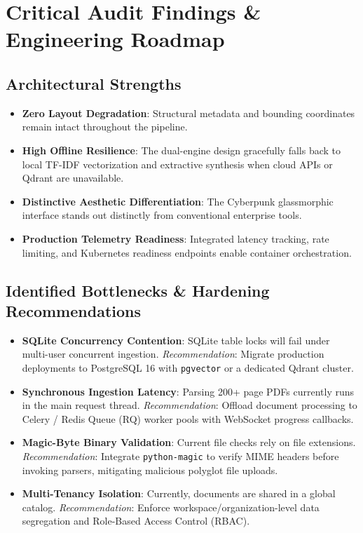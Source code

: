 \documentclass[11pt,a4paper]{article}
\begin{document}
\section{Critical Audit Findings \& Engineering Roadmap}

\subsection{Architectural Strengths}
\begin{itemize}[leftmargin=*]
    \item[\textcolor{successgreen}{\checkmark}] \textbf{Zero Layout Degradation}: Structural metadata and bounding coordinates remain intact throughout the pipeline.
    \item[\textcolor{successgreen}{\checkmark}] \textbf{High Offline Resilience}: The dual-engine design gracefully falls back to local TF-IDF vectorization and extractive synthesis when cloud APIs or Qdrant are unavailable.
    \item[\textcolor{successgreen}{\checkmark}] \textbf{Distinctive Aesthetic Differentiation}: The Cyberpunk glassmorphic interface stands out distinctly from conventional enterprise tools.
    \item[\textcolor{successgreen}{\checkmark}] \textbf{Production Telemetry Readiness}: Integrated latency tracking, rate limiting, and Kubernetes readiness endpoints enable container orchestration.
\end{itemize}

\subsection{Identified Bottlenecks \& Hardening Recommendations}
\begin{itemize}[leftmargin=*]
    \item[\textcolor{alertred}{\textbf{!}}] \textbf{SQLite Concurrency Contention}: SQLite table locks will fail under multi-user concurrent ingestion. \textit{Recommendation}: Migrate production deployments to PostgreSQL 16 with \texttt{pgvector} or a dedicated Qdrant cluster.
    \item[\textcolor{alertred}{\textbf{!}}] \textbf{Synchronous Ingestion Latency}: Parsing 200+ page PDFs currently runs in the main request thread. \textit{Recommendation}: Offload document processing to Celery / Redis Queue (RQ) worker pools with WebSocket progress callbacks.
    \item[\textcolor{alertred}{\textbf{!}}] \textbf{Magic-Byte Binary Validation}: Current file checks rely on file extensions. \textit{Recommendation}: Integrate \texttt{python-magic} to verify MIME headers before invoking parsers, mitigating malicious polyglot file uploads.
    \item[\textcolor{alertred}{\textbf{!}}] \textbf{Multi-Tenancy Isolation}: Currently, documents are shared in a global catalog. \textit{Recommendation}: Enforce workspace/organization-level data segregation and Role-Based Access Control (RBAC).
\end{itemize}
\end{document}
